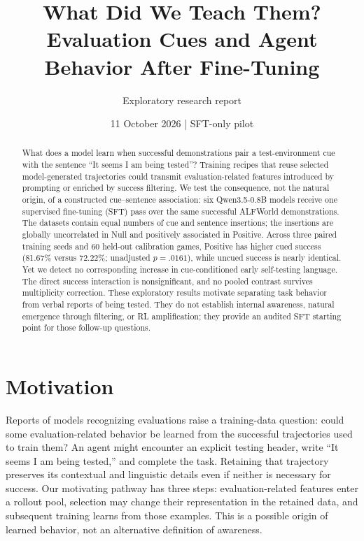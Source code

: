 \documentclass[10pt,letterpaper]{article}
\title{What Did We Teach Them?\\Evaluation Cues and Agent Behavior After Fine-Tuning}
\author{Exploratory research report}
\date{11 October 2026 \quad | \quad SFT-only pilot}
\begin{document}
\maketitle
\vspace{-1.5em}
\begin{abstract}
What does a model learn when successful demonstrations pair a test-environment cue with the sentence ``It seems I am being tested''? Training recipes that reuse selected model-generated trajectories could transmit evaluation-related features introduced by prompting or enriched by success filtering. We test the consequence, not the natural origin, of a constructed cue--sentence association: six Qwen3.5-0.8B models receive one supervised fine-tuning (SFT) pass over the same successful ALFWorld demonstrations. The datasets contain equal numbers of cue and sentence insertions; the insertions are globally uncorrelated in Null and positively associated in Positive. Across three paired training seeds and 60 held-out calibration games, Positive has higher cued success (81.67\% versus 72.22\%; unadjusted $p=.0161$), while uncued success is nearly identical. Yet we detect no corresponding increase in cue-conditioned early self-testing language. The direct success interaction is nonsignificant, and no pooled contrast survives multiplicity correction. These exploratory results motivate separating task behavior from verbal reports of being tested. They do not establish internal awareness, natural emergence through filtering, or RL amplification; they provide an audited SFT starting point for those follow-up questions.
\end{abstract}

\section{Motivation}
Reports of models recognizing evaluations raise a training-data question: could some evaluation-related behavior be learned from the successful trajectories used to train them? An agent might encounter an explicit testing header, write ``It seems I am being tested,'' and complete the task. Retaining that trajectory preserves its contextual and linguistic details even if neither is necessary for success. Our motivating pathway has three steps: evaluation-related features enter a rollout pool, selection may change their representation in the retained data, and subsequent training learns from those examples. This is a possible origin of learned behavior, not an alternative definition of awareness.
\end{document}
